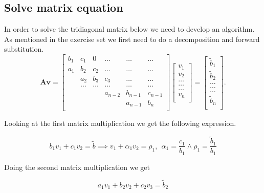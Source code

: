 \documentclass[reprint, english,notitlepage]{revtex4-1}  %
\begin{document}
\subsection{Solve matrix equation}

In order to solve the tridiagonal matrix below we need to develop an algorithm. As mentioned in the exercise set we first need to do a decomposition and forward substitution.
\begin{equation*}
\mathbf{A}\mathbf{v} = \begin{bmatrix}
b_1& c_1 & 0 &\dots   & \dots &\dots \\
a_1 & b_2 & c_2 &\dots &\dots &\dots \\
& a_2 & b_3 & c_3 & \dots & \dots \\
& \dots   & \dots &\dots   &\dots & \dots \\
&   &  &a_{n-2}  &b_{n-1}& c_{n-1} \\
&    &  &   &a_{n-1} & b_n \\
\end{bmatrix}\begin{bmatrix}
v_1\\
v_2\\
\dots \\
\dots  \\
\dots \\
v_n\\
\end{bmatrix}
=\begin{bmatrix}
\tilde{b}_1\\
\tilde{b}_2\\
\dots \\
\dots \\
\dots \\
\tilde{b}_n\\
\end{bmatrix}.
\end{equation*}

Looking at the first matrix multiplication we get the following expression.

\begin{equation}
	b_1 v_1 + c_1 v_2 = \tilde{b} \implies v_1 + \alpha_1 v_2 = \rho _1, \ \ \alpha_1 = \frac{c_1}{b_1} \wedge \rho_1 = \frac{\tilde{b}_1}{b_1} 
	\label{eq:mat1}
\end{equation}

Doing the second matrix multiplication we get

\begin{equation}
	a_1 v_1 + b_2 v_2 + c_2 v_3 = \tilde{b}_2
	\label{eq:mat2}
\end{equation}
\end{document}
